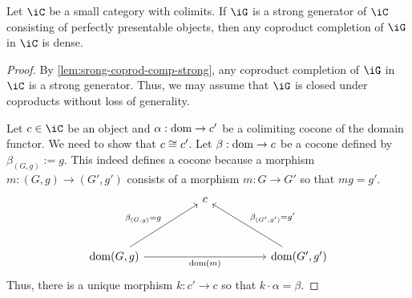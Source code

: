 \documentclass{zett}
\begin{document}
\begin{lem}\label{lem:sg-pp-dense}
  Let $\iC$ be a small category with colimits.
  If $\iG$ is a strong generator of $\iC$ consisting of perfectly presentable objects, then any coproduct completion of $\iG$ in $\iC$ is dense.
\end{lem}
\begin{proof}
  By \cref{lem:srong-coprod-comp-strong}, any coproduct completion of $\iG$ in $\iC$ is a strong generator.
  Thus, we may assume that $\iG$ is closed under coproducts without loss of generality.

  Let $c \in \iC$ be an object and $\alpha : \operatorname{dom} \to c'$ be a colimiting cocone of the domain functor.
  We need to show that $c \cong c'$.
  Let $\beta : \operatorname{dom} \to c$ be a cocone defined by $\beta_{(G,g)} := g$.
  This indeed defines a cocone because a morphism $m : (G,g) \to (G',g')$ consists of a morphism $m : G \to G'$ so that $mg = g'$.
  \[\begin{tikzcd}
      && c \\
      \\
      {\dom(G,g)} &&&& {\dom(G',g')}
      \arrow["{\dom(m)}"', from=3-1, to=3-5]
      \arrow["{\beta_{(G,g)} = g}", from=3-1, to=1-3]
      \arrow["{\beta_{(G',g')} = g'}"', from=3-5, to=1-3]
    \end{tikzcd}\]
  Thus, there is a unique morphism $k : c' \to c$ so that $k \cdot \alpha = \beta$.


\end{proof}
\end{document}
